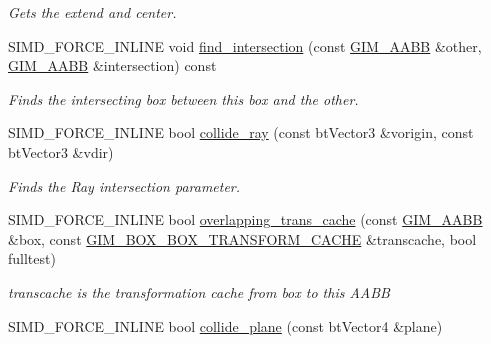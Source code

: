 \begin{CompactItemize}
\begin{CompactList}\small\item\em Gets the extend and center. \item\end{CompactList}\item 
\hypertarget{class_g_i_m___a_a_b_b_61a5dc7c0f802b2f4ef782b6bed04938}{
SIMD\_\-FORCE\_\-INLINE void \hyperlink{class_g_i_m___a_a_b_b_61a5dc7c0f802b2f4ef782b6bed04938}{find\_\-intersection} (const \hyperlink{class_g_i_m___a_a_b_b}{GIM\_\-AABB} \&other, \hyperlink{class_g_i_m___a_a_b_b}{GIM\_\-AABB} \&intersection) const }
\label{class_g_i_m___a_a_b_b_61a5dc7c0f802b2f4ef782b6bed04938}

\begin{CompactList}\small\item\em Finds the intersecting box between this box and the other. \item\end{CompactList}\item 
SIMD\_\-FORCE\_\-INLINE bool \hyperlink{class_g_i_m___a_a_b_b_1fafc37703d288fd0fe862b861829287}{collide\_\-ray} (const btVector3 \&vorigin, const btVector3 \&vdir)
\begin{CompactList}\small\item\em Finds the Ray intersection parameter. \item\end{CompactList}\item 
\hypertarget{class_g_i_m___a_a_b_b_f4c6c48e03d316e74e00b2ab261fd125}{
SIMD\_\-FORCE\_\-INLINE bool \hyperlink{class_g_i_m___a_a_b_b_f4c6c48e03d316e74e00b2ab261fd125}{overlapping\_\-trans\_\-cache} (const \hyperlink{class_g_i_m___a_a_b_b}{GIM\_\-AABB} \&box, const \hyperlink{class_g_i_m___b_o_x___b_o_x___t_r_a_n_s_f_o_r_m___c_a_c_h_e}{GIM\_\-BOX\_\-BOX\_\-TRANSFORM\_\-CACHE} \&transcache, bool fulltest)}
\label{class_g_i_m___a_a_b_b_f4c6c48e03d316e74e00b2ab261fd125}

\begin{CompactList}\small\item\em transcache is the transformation cache from box to this AABB \item\end{CompactList}\item 
\hypertarget{class_g_i_m___a_a_b_b_05940e89bdd3fa59cc8cd3af6e1b876c}{
SIMD\_\-FORCE\_\-INLINE bool \hyperlink{class_g_i_m___a_a_b_b_05940e89bdd3fa59cc8cd3af6e1b876c}{collide\_\-plane} (const btVector4 \&plane)}
\label{class_g_i_m___a_a_b_b_05940e89bdd3fa59cc8cd3af6e1b876c}


\end{CompactItemize}
